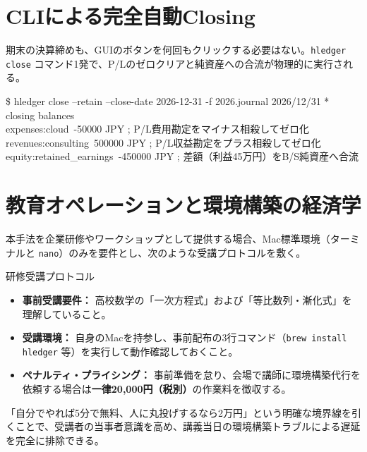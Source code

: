\documentclass[11pt, a4paper]{report}
\begin{document}
\section{CLIによる完全自動Closing}

期末の決算締めも、GUIのボタンを何回もクリックする必要はない。\texttt{hledger close} コマンド1発で、P/Lのゼロクリアと純資産への合流が物理的に実行される。

\begin{terminalbox}{\$ hledger close --retain --close-date 2026-12-31 -f 2026.journal}
2026/12/31 * closing balances\\
\quad expenses:cloud\qquad\qquad\ -50000 JPY \quad ; P/L費用勘定をマイナス相殺してゼロ化\\
\quad revenues:consulting\qquad\ 500000 JPY \quad ; P/L収益勘定をプラス相殺してゼロ化\\
\quad equity:retained\_earnings\ -450000 JPY \quad ; 差額（利益45万円）をB/S純資産へ合流
\end{terminalbox}

\section{教育オペレーションと環境構築の経済学}

本手法を企業研修やワークショップとして提供する場合、Mac標準環境（ターミナルと \texttt{nano}）のみを要件とし、次のような受講プロトコルを敷く。

\begin{rulebox}{研修受講プロトコル}
\begin{itemize}
    \item \textbf{事前受講要件：} 高校数学の「一次方程式」および「等比数列・漸化式」を理解していること。
    \item \textbf{受講環境：} 自身のMacを持参し、事前配布の3行コマンド（\texttt{brew install hledger} 等）を実行して動作確認しておくこと。
    \item \textbf{ペナルティ・プライシング：} 事前準備を怠り、会場で講師に環境構築代行を依頼する場合は\textbf{一律20,000円（税別）}の作業料を徴収する。
\end{itemize}
\end{rulebox}

「自分でやれば5分で無料、人に丸投げするなら2万円」という明確な境界線を引くことで、受講者の当事者意識を高め、講義当日の環境構築トラブルによる遅延を完全に排除できる。

\end{document}
